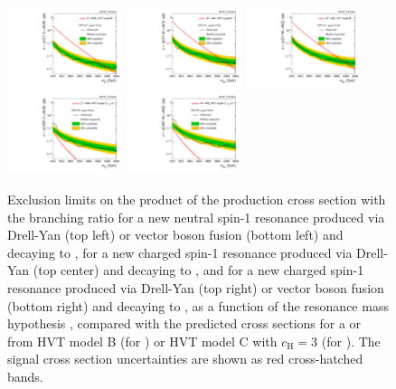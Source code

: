 \begin{figure}[htbp]
  \centering
  \includegraphics[width=0.3\textwidth]{fig/results/limits_ZprToWW_o_74.pdf}
  \includegraphics[width=0.3\textwidth]{fig/results/limits_WprToWH_o_74.pdf}
  \includegraphics[width=0.3\textwidth]{fig/results/limits_WprToWZ_o_74.pdf}\\
  \includegraphics[width=0.3\textwidth]{fig/results/limits_VBFZprToWW_o_74.pdf}
  \includegraphics[width=0.3\textwidth]{fig/results/limits_VBFWprToWZ_o_74.pdf}
  \caption{
    Exclusion limits on the product of the production cross section with the branching ratio for a new neutral spin-1 resonance produced via Drell-Yan (top left) or vector boson fusion (bottom left) and decaying to \WW, for a new charged spin-1 resonance produced via Drell-Yan (top center) and decaying to \WH, and for a new charged spin-1 resonance produced via Drell-Yan (top right) or vector boson fusion (bottom right) and decaying to \WZ, as a function of the resonance mass hypothesis \MX, compared with the predicted cross sections for a \Wpr or \Zpr from HVT model B (for \DY)  or HVT model C with $c_\mathrm{H}=3$ (for \VBF).
    The signal cross section uncertainties are shown as red cross-hatched bands.
  }
  \label{fig:exclusion_limits_spin1}
\end{figure}

